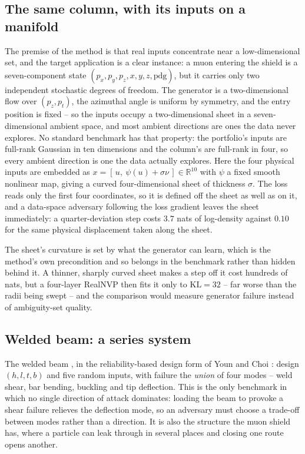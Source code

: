 \documentclass[11pt]{article}
\newcommand{\R}{\mathbb{R}}
\begin{document}
\subsection{The same column, with its inputs on a manifold}
\label{p:man}
The premise of the method is that real inputs concentrate near a low-dimensional set, and
the target application is a clear instance: a muon entering the shield is a seven-component
state $(p_x,p_y,p_z,x,y,z,\mathrm{pdg})$, but it carries only two independent stochastic
degrees of freedom. The generator is a two-dimensional flow over $(p_z, p_t)$, the azimuthal
angle is uniform by symmetry, and the entry position is fixed -- so the inputs occupy a
two-dimensional sheet in a seven-dimensional ambient space, and most ambient directions are
ones the data never explores. No standard benchmark has that property: the portfolio's inputs are full-rank Gaussian in ten
dimensions and the column's are full-rank in four, so every ambient direction is one the
data actually explores. Here the four physical inputs are embedded as
$x = [\,u,\ \psi(u) + \sigma\nu\,] \in \R^{10}$ with $\psi$ a fixed smooth nonlinear map,
giving a curved four-dimensional sheet of thickness $\sigma$. The loss reads only the first
four coordinates, so it is defined off the sheet as well as on it, and a data-space
adversary following the loss gradient leaves the sheet immediately: a quarter-deviation
step costs $3.7$ nats of log-density against $0.10$ for the same physical displacement
taken along the sheet.

The sheet's curvature is set by what the generator can learn, which is the method's own
precondition and so belongs in the benchmark rather than hidden behind it. A thinner,
sharply curved sheet makes a step off it cost hundreds of nats, but a four-layer RealNVP
then fits it only to $\mathrm{KL}=32$ -- far worse than the radii being swept -- and the
comparison would measure generator failure instead of ambiguity-set quality.

\subsection{Welded beam: a series system}
\label{p:beam}
The welded beam \citep{ragsdell1976}, in the reliability-based design form of
Youn and Choi \citep{youn2004}: design $(h,l,t,b)$ and five random inputs, with failure the \emph{union}
of four modes -- weld shear, bar bending, buckling and tip deflection. This is the only
benchmark in which no single direction of attack dominates: loading the beam to provoke a
shear failure relieves the deflection mode, so an adversary must choose a trade-off between
modes rather than a direction. It is also the structure the muon shield has, where a
particle can leak through in several places and closing one route opens another.
\end{document}
